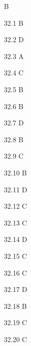 \begin{Solution}{32}
B
\end{Solution}
\begin{Solution}{32.{1}}
B
\end{Solution}
\begin{Solution}{32.{2}}
D
\end{Solution}
\begin{Solution}{32.{3}}
A
\end{Solution}
\begin{Solution}{32.{4}}
C
\end{Solution}
\begin{Solution}{32.{5}}
B
\end{Solution}
\begin{Solution}{32.{6}}
B
\end{Solution}
\begin{Solution}{32.{7}}
D
\end{Solution}
\begin{Solution}{32.{8}}
B
\end{Solution}
\begin{Solution}{32.{9}}
C
\end{Solution}
\begin{Solution}{32.{10}}
B
\end{Solution}
\begin{Solution}{32.{11}}
D
\end{Solution}
\begin{Solution}{32.{12}}
C
\end{Solution}
\begin{Solution}{32.{13}}
C
\end{Solution}
\begin{Solution}{32.{14}}
D
\end{Solution}
\begin{Solution}{32.{15}}
C
\end{Solution}
\begin{Solution}{32.{16}}
C
\end{Solution}
\begin{Solution}{32.{17}}
D
\end{Solution}
\begin{Solution}{32.{18}}
B
\end{Solution}
\begin{Solution}{32.{19}}
C
\end{Solution}
\begin{Solution}{32.{20}}
C
\end{Solution}
